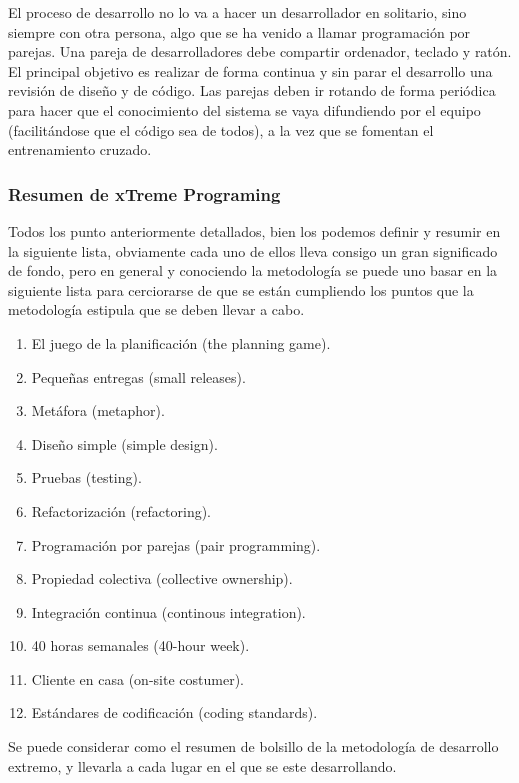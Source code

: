 \documentclass[12pt]{book} %
\begin{document}
			El proceso de desarrollo no lo va a hacer un desarrollador en solitario, sino siempre con otra persona, algo que se ha venido a 
			llamar programación por parejas. Una pareja de desarrolladores debe compartir ordenador, teclado y ratón. El principal objetivo 
			es realizar de forma continua y sin parar el desarrollo una revisión de diseño y de código. Las parejas deben ir rotando de
			forma periódica para hacer que el conocimiento del sistema se vaya difundiendo por el equipo (facilitándose que el código sea 
			de todos), a la vez que se fomentan el entrenamiento cruzado.
			
		\subsubsection{Resumen de xTreme Programing}	
			Todos los punto anteriormente detallados, bien los podemos definir y resumir en la siguiente lista, obviamente cada uno de 
			ellos lleva consigo un gran significado de fondo, pero en general  y conociendo la metodología se puede uno basar en la
			siguiente lista para cerciorarse de que se están cumpliendo los puntos que la metodología estipula que se deben llevar a cabo.
			\begin{multicols}{2}
				\begin{enumerate}
					\item El juego de la planificación (the planning game).
					\item Pequeñas entregas (small releases).
					\item Metáfora (metaphor).
					\item Diseño simple (simple design).
					\item Pruebas (testing).
					\item Refactorización (refactoring).
					\item Programación por parejas (pair programming).
					\item Propiedad colectiva (collective ownership).
					\item Integración continua (continous integration).
					\item 40 horas semanales (40-hour week).
					\item Cliente en casa (on-site costumer).
					\item Estándares de codificación (coding standards).
				\end{enumerate}
			\end{multicols}
			
			Se puede considerar como el resumen de bolsillo de la metodología de desarrollo extremo, y llevarla a cada lugar en el que se este desarrollando.
\end{document}
